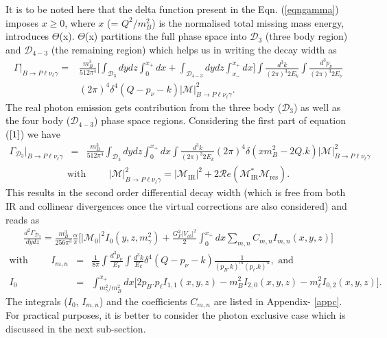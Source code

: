\documentclass[a4paper,11pt]{article}
\begin{document}
	It is to be noted here that the delta function present in the Eqn. (\ref{eqngamma}) imposes $x\geq 0$, where $x$ (= $Q^{2}/m_{B}^{2}$) is the normalised total missing mass energy, introduces $\Theta$(x). $\Theta$(x) partitions the full phase space into $\mathcal{D}_3$ (three body region) and $\mathcal{D}_{4-3}$ (the remaining region) which helps us in writing the decay width as
	\begin{eqnarray}
	   \Gamma|_{B\to P \ell \nu_{\ell} \gamma}=&\frac{m_{B}^{3}}{512 \pi^{4}}\Big[\int_{\mathcal{D}_{3}} dy dz \int_{0}^{x_{+}} dx + \int_{\mathcal{D}_{4-3}} dy dz \int_{x_{-}}^{x_{+}} dx \Big] \int \frac{d^{3}k}{(2\pi)^{3} 2E_{k}} \int \frac{d^{3}p_{\nu}}{(2\pi)^{3} 2E_{\nu}}\nonumber \\ &(2\pi)^{4} \delta^{4}(Q - p_{\nu}-k) \left|\mathcal{M}\right|_{B\to P \ell \nu_{\ell} \gamma}^{2}.
	   \label{1}
	   \end{eqnarray}
	   The real photon emission gets contribution from the three body ($\mathcal{D}_3$) as well as the four body ($\mathcal{D}_{4-3}$) phase space regions. Considering the first part of equation ($\ref{1}$) we have  
		{\small \begin{eqnarray}
		\Gamma_{\mathcal{D}_3}|_{B\to P \ell \nu_{\ell} \gamma}&=& \frac{m_{B}^{3}}{512 \pi^{4}}\int_{\mathcal{D}_{3}} dy dz \int_{0}^{x_{+}} dx \int \frac{d^{3}k}{(2\pi)^{3} 2E_{k}}(2\pi)^{4} \delta(x m_{B}^2 - 2 Q.k) \left|\mathcal{M}\right|_{B\to P \ell \nu_{\ell} \gamma}^{2}
		\label{eqnd3}
		\end{eqnarray}}
		\begin{eqnarray}
		\text{with}\hspace{1cm}\left|\mathcal{M}\right|_{B\to P \ell \nu_{\ell} \gamma}^{2}=\left|\mathcal{M}_{\text{IR}}\right|^{2}+ 2\mathcal{R}e(\mathcal{M}_{\text{IR}}^{*}\mathcal{M}_{\text{res}}).
		\end{eqnarray}
		This results in the second order differential decay width (which is free from both IR and collinear divergences once the virtual corrections are also considered) and reads as
		 \begin{eqnarray}
		\frac{d^{2} \Gamma_{\mathcal{D}_3}}{dy dz}=\frac{m_{B}^3}{256\pi^{3}}\frac{\alpha}{\pi}\Big[ \left|\mathcal{M}_{0}\right|^{2} I_{0}(y,z,m_{\gamma}^{2})+\frac{G_{F}^{2}\left|V_{cb}\right|^{2}}{2}\int_{0}^{x_{+}}dx \sum_{m,n} C_{m,n} I_{m,n}(x,y,z) \Big]
		\end{eqnarray}	
		{\small\begin{eqnarray}
		\text{with}\hspace{1cm}I_{m,n} &=& \frac{1}{8\pi}\int \frac{d^{3}p_{\nu}}{E_{\nu}}  \int \frac{d^{3}k}{E_{k}} \delta^{4}(Q- p_{\nu}-k) \frac{1}{(p_{B}.k)^{m} (p_{\ell}.k)^{n}}, \text{  and}\\
         I_{0}&=&\int_{m_{\gamma}^{2}/m_{B}^{2}}^{x_{+}}dx \Big[2 p_{B}.p_{\ell} I_{1,1}(x,y,z) - m_{B}^{2} I_{2,0}(x,y,z) - m_{\ell}^{2} I_{0,2}(x,y,z)\Big].
		\end{eqnarray}}
		The integrals ($I_{0}$, $I_{m,n}$) and the coefficients $C_{m,n}$ are listed in Appendix- \ref{appc}. 
		For practical purposes, it is better to consider the photon exclusive case which is discussed in the next sub-section.
\end{document}
